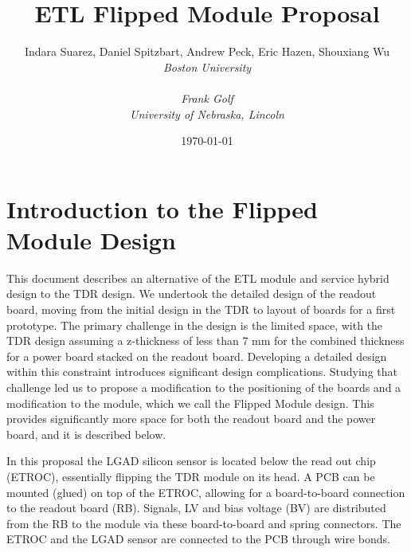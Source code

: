 \documentclass[11pt]{article}
\title{ETL Flipped Module Proposal}
\author{Indara Suarez, Daniel Spitzbart, Andrew Peck, Eric Hazen, Shouxiang Wu \\
  \em{Boston University}\\
  \\Frank Golf\\
  \em{University of Nebraska, Lincoln}
}
\date{\today}
\begin{document}
\maketitle

\tableofcontents

\clearpage

\section{Introduction to the Flipped Module Design}

This document describes an alternative of the ETL module and service hybrid design to the TDR design.
We undertook the detailed design of the readout board, moving from the initial design in the TDR to layout of boards for a first prototype.
The primary challenge in the design is the limited space, with the TDR design assuming a z-thickness of less than 7 mm for the combined thickness for a power board stacked on the readout board.
Developing a detailed design within this constraint introduces significant design complications.
Studying that challenge led us to propose a modification to the positioning of the boards and a modification to the module, which we call the Flipped Module design.
This provides significantly more space for both the readout board and the power board, and it is described below.

In this proposal the LGAD silicon sensor is located below the read out chip (ETROC), essentially flipping the TDR module on its head.
A PCB can be mounted (glued) on top of the ETROC, allowing for a board-to-board connection to the readout board (RB).
Signals, LV and bias voltage (BV) are distributed from the RB to the module via these board-to-board and spring connectors.
The ETROC and the LGAD sensor are connected to the PCB through wire bonds.
\end{document}
